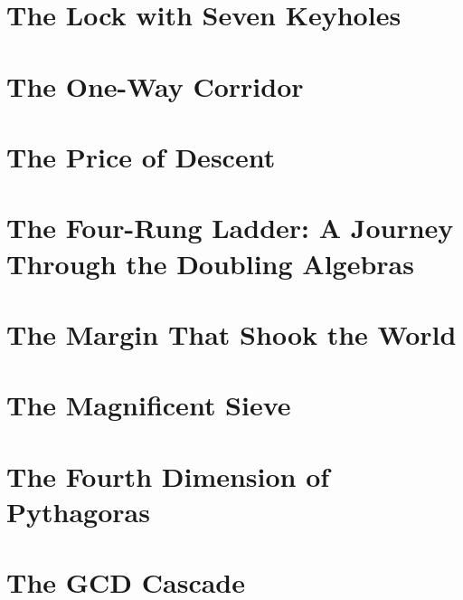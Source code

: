 \documentclass[11pt,openright,twoside,extrafontsizes]{memoir}
\theoremstyle{definition}
\begin{document}
\chapter{The Lock with Seven Keyholes}


\chapter{The One-Way Corridor}


\chapter{The Price of Descent}


\chapter{The Four-Rung Ladder: A Journey Through the Doubling Algebras}


\chapter{The Margin That Shook the World}


\chapter{The Magnificent Sieve}


\chapter{The Fourth Dimension of Pythagoras}


\chapter{The GCD Cascade}


\end{document}
